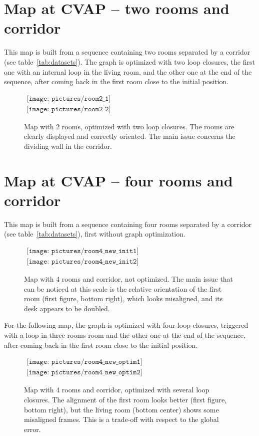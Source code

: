 \clearpage
\section{Map at CVAP -- two rooms and corridor}

This map is built from a sequence containing two rooms separated by a corridor (see table~\ref{tab:datasets}). The graph is optimized with two loop closures, the first one with an internal loop in the living room, and the other one at the end of the sequence, after coming back in the first room close to the initial position. 

\begin{figure}[H]
\centering$
 \begin{array}{c}
 \texttt{[image: pictures/room2\_1]}\\
 \texttt{[image: pictures/room2\_2]}
 \end{array}$
\caption{Map with 2 rooms, optimized with two loop closures. The rooms are clearly displayed and correctly oriented. The main issue concerns the dividing wall in the corridor.}
\end{figure}

\clearpage
\section{Map at CVAP -- four rooms and corridor}

This map is built from a sequence containing four rooms separated by a corridor (see table~\ref{tab:datasets}), first without graph optimization. 

\begin{figure}[H]
\centering$
 \begin{array}{c}
 \texttt{[image: pictures/room4\_new\_init1]}\\
 \texttt{[image: pictures/room4\_new\_init2]}
 \end{array}$
\caption{Map with 4 rooms and corridor, not optimized. The main issue that can be noticed at this scale is the relative orientation of the first room (first figure, bottom right), which looks misaligned, and its desk appears to be doubled.}
\end{figure}

\clearpage
For the following map, the graph is optimized with four loop closures, triggered with a loop in three rooms room and the other one at the end of the sequence, after coming back in the first room close to the initial position.

\begin{figure}[H]
\centering$
 \begin{array}{c}
 \texttt{[image: pictures/room4\_new\_optim1]}\\
 \texttt{[image: pictures/room4\_new\_optim2]}
 \end{array}$
\caption{Map with 4 rooms and corridor, optimized with several loop closures. The alignment of the first room looks better (first figure, bottom right), but the living room (bottom center) shows some misaligned frames. This is a trade-off with respect to the global error.}
\end{figure}

